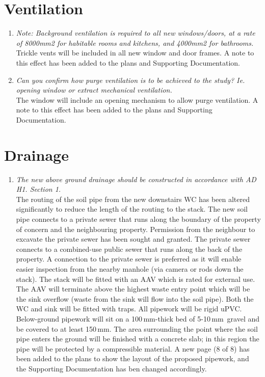 \documentclass{extension}
\newcommand{\mm}{\,$\mathrm{mm}$}
\begin{document}
\section{Ventilation}
\begin{enumerate}
\item {\it Note: Background ventilation is required to all new windows/doors, at a rate of 8000mm2 for habitable rooms and kitchens, and 4000mm2 for bathrooms.}\\
Trickle vents will be included in all new window and door frames. A note to this effect has been added to the plans and Supporting Documentation.
\item {\it Can you confirm how purge ventilation is to be achieved to the study? Ie. opening window or extract mechanical ventilation.}\\
The window will include an opening mechanism to allow purge ventilation. A note to this effect has been added to the plans and Supporting Documentation.
\end{enumerate}

\section{Drainage}
\begin{enumerate}
\item {\it The new above ground drainage should be constructed in accordance with AD H1. Section 1.}\\
The routing of the soil pipe from the new downstairs WC has been altered significantly to reduce the length of the routing to the stack. The new soil pipe connects to a private sewer that runs along the boundary of the property of concern and the neighbouring property. Permission from the neighbour to excavate the private sewer has been sought and granted. The private sewer connects to a combined-use public sewer that runs along the back of the property. A connection to the private sewer is preferred as it will enable easier inspection from the nearby manhole (via camera or rods down the stack). The stack will be fitted with an AAV which is rated for external use.\cite{aav} The AAV will terminate above the highest waste entry point which will be the sink overflow (waste from the sink will flow into the soil pipe). Both the WC and sink will be fitted with traps. All pipework will be rigid uPVC. Below-ground pipework will sit on a 100\mm -thick bed of 5-10\mm\ gravel and be covered to at least 150\mm. The area surrounding the point where the soil pipe enters the ground will be finished with a concrete slab; in this region the pipe will be protected by a compressible material. A new page (8 of 8) has been added to the plans to show the layout of the proposed pipework, and the Supporting Documentation has ben changed accordingly.
\end{enumerate}
\end{document}
